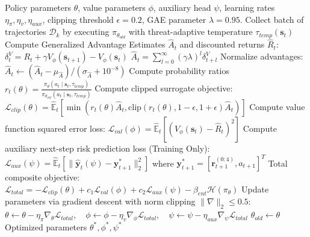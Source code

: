 \documentclass[11pt,a4paper]{article}
\begin{document}
\begin{algorithm}[!htbp]
\caption{Threat-Aware Policy Optimization with Auxiliary Risk Regularization}
\label{alg:policy_training}
\small
\begin{algorithmic}[1]
\Require Policy parameters $\theta$, value parameters $\phi$, auxiliary head $\psi$, learning rates $\eta_\pi, \eta_v, \eta_{aux}$, clipping threshold $\epsilon = 0.2$, GAE parameter $\lambda = 0.95$.
    \State Collect batch of trajectories $\mathcal{D}_k$ by executing $\pi_{\theta_{old}}$ with threat-adaptive temperature $\tau_{temp}(\mathbf{s}_t)$
    \State Compute Generalized Advantage Estimates $\hat{A}_t$ and discounted returns $\hat{R}_t$:
    \State \quad $\delta_t^V = R_t + \gamma V_\phi(\mathbf{s}_{t+1}) - V_\phi(\mathbf{s}_t)$
    \State \quad $\hat{A}_t = \sum_{l=0}^{\infty} (\gamma \lambda)^l \delta_{t+l}^V$
    \State Normalize advantages: $\hat{A}_t \leftarrow (\hat{A}_t - \mu_{\hat{A}}) / (\sigma_{\hat{A}} + 10^{-8})$
        \State Compute probability ratios $r_t(\theta) = \frac{\pi_\theta(a_t \mid \mathbf{s}_t, \tau_{temp})}{\pi_{\theta_{old}}(a_t \mid \mathbf{s}_t, \tau_{temp})}$
        \State Compute clipped surrogate objective:
        \State \quad $\mathcal{L}_{clip}(\theta) = \hat{\mathbb{E}}_t \left[ \min\left(r_t(\theta)\hat{A}_t, \text{clip}(r_t(\theta), 1-\epsilon, 1+\epsilon)\hat{A}_t\right) \right]$
        \State Compute value function squared error loss:
        \State \quad $\mathcal{L}_{val}(\phi) = \hat{\mathbb{E}}_t \left[ (V_\phi(\mathbf{s}_t) - \hat{R}_t)^2 \right]$
        \State Compute auxiliary next-step risk prediction loss (Training Only):
        \State \quad $\mathcal{L}_{aux}(\psi) = \hat{\mathbb{E}}_t \left[ \|\hat{\mathbf{y}}_t(\psi) - \mathbf{y}_{t+1}^*\|_2^2 \right]$ where $\mathbf{y}_{t+1}^* = [\mathbf{r}_{t+1}^{(0:4)}, a_{t+1}]^T$
        \State Total composite objective: $\mathcal{L}_{total} = -\mathcal{L}_{clip}(\theta) + c_1 \mathcal{L}_{val}(\phi) + c_2 \mathcal{L}_{aux}(\psi) - \beta_{ent} \mathcal{H}(\pi_\theta)$
        \State Update parameters via gradient descent with norm clipping $\|\nabla\|_2 \le 0.5$:
        \State \quad $\theta \leftarrow \theta - \eta_\pi \nabla_\theta \mathcal{L}_{total}, \quad \phi \leftarrow \phi - \eta_v \nabla_\phi \mathcal{L}_{total}, \quad \psi \leftarrow \psi - \eta_{aux} \nabla_\psi \mathcal{L}_{total}$
    \EndFor
    \State $\theta_{old} \leftarrow \theta$
\EndFor
\State \Return Optimized parameters $\theta^*, \phi^*, \psi^*$
\end{algorithmic}
\end{algorithm}
\end{document}
